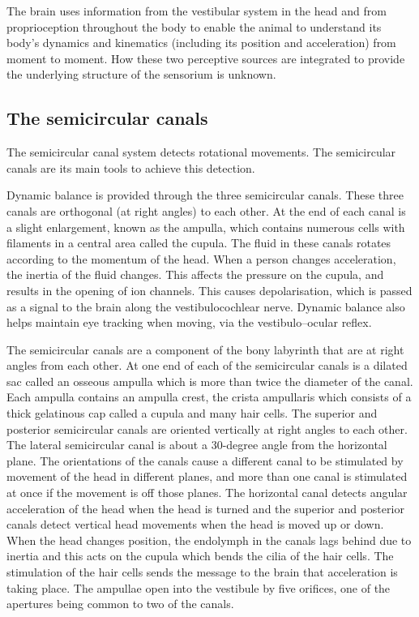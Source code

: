 \documentclass[]{book}
\begin{document}
The brain uses information from the vestibular system in the head and from proprioception throughout the body to enable the animal to understand its body's dynamics and kinematics (including its position and acceleration) from moment to moment. How these two perceptive sources are integrated to provide the underlying structure of the sensorium is unknown.

\hypertarget{the-semicircular-canals}{%
\subsection{The semicircular canals}\label{the-semicircular-canals}}

The semicircular canal system detects rotational movements. The semicircular canals are its main tools to achieve this detection.

Dynamic balance is provided through the three semicircular canals. These three canals are orthogonal (at right angles) to each other. At the end of each canal is a slight enlargement, known as the ampulla, which contains numerous cells with filaments in a central area called the cupula. The fluid in these canals rotates according to the momentum of the head. When a person changes acceleration, the inertia of the fluid changes. This affects the pressure on the cupula, and results in the opening of ion channels. This causes depolarisation, which is passed as a signal to the brain along the vestibulocochlear nerve. Dynamic balance also helps maintain eye tracking when moving, via the vestibulo--ocular reflex.

The semicircular canals are a component of the bony labyrinth that are at right angles from each other. At one end of each of the semicircular canals is a dilated sac called an osseous ampulla which is more than twice the diameter of the canal. Each ampulla contains an ampulla crest, the crista ampullaris which consists of a thick gelatinous cap called a cupula and many hair cells. The superior and posterior semicircular canals are oriented vertically at right angles to each other. The lateral semicircular canal is about a 30-degree angle from the horizontal plane. The orientations of the canals cause a different canal to be stimulated by movement of the head in different planes, and more than one canal is stimulated at once if the movement is off those planes. The horizontal canal detects angular acceleration of the head when the head is turned and the superior and posterior canals detect vertical head movements when the head is moved up or down. When the head changes position, the endolymph in the canals lags behind due to inertia and this acts on the cupula which bends the cilia of the hair cells. The stimulation of the hair cells sends the message to the brain that acceleration is taking place. The ampullae open into the vestibule by five orifices, one of the apertures being common to two of the canals.
\end{document}
